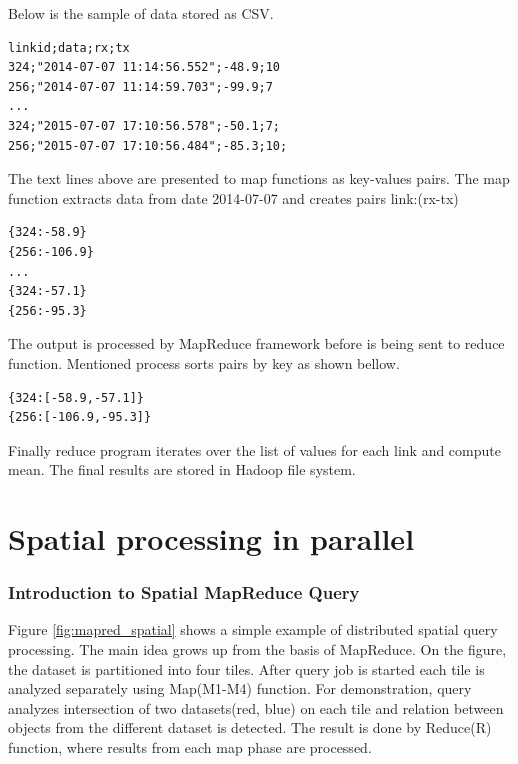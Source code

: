 \documentclass[a4paper,12pt,oneside]{report}
\begin{document}
Below is the sample of data stored as CSV.
\begin{footnotesize}\begin{lstlisting}[style=mybash]
linkid;data;rx;tx
324;"2014-07-07 11:14:56.552";-48.9;10
256;"2014-07-07 11:14:59.703";-99.9;7
...
324;"2015-07-07 17:10:56.578";-50.1;7;
256;"2015-07-07 17:10:56.484";-85.3;10;
\end{lstlisting}\end{footnotesize}
 

The text lines above are presented to map functions as key-values pairs.
The map function extracts data from date 2014-07-07 and creates pairs {link:(rx-tx)}
\begin{footnotesize}\begin{lstlisting}[style=mybash]
{324:-58.9}
{256:-106.9}
...
{324:-57.1}
{256:-95.3}
\end{lstlisting}\end{footnotesize}


The output is processed by MapReduce framework before is being sent to reduce function.
Mentioned process sorts pairs by key as shown bellow.
\begin{footnotesize}\begin{lstlisting}[style=mybash]
{324:[-58.9,-57.1]}
{256:[-106.9,-95.3]}
\end{lstlisting}\end{footnotesize}


Finally reduce program iterates over the list of values for each link and compute mean.
 The final results are stored in Hadoop file system.
 


\section{Spatial processing in parallel}
	\subsubsection{Introduction to Spatial MapReduce Query}
Figure \ref{fig:mapred_spatial} shows a simple example of distributed spatial query processing. The main idea 
grows up from the basis of MapReduce. On the figure, the dataset is partitioned into four tiles. After 
query job is started each tile is analyzed separately using Map(M1-M4) function. For demonstration, 
query analyzes intersection of two datasets(red, blue) on each tile and relation between 
objects from the different dataset is detected. The result is done by Reduce(R) function, where results from each
map phase are processed.
\end{document}
